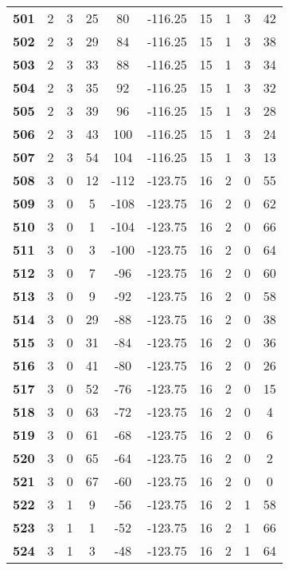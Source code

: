 \documentclass{article}%
\begin{document}
\begin{longtable}{cccccccccc}
        \textbf{501} & 2 & 3 & 25 & 80 & -116.25 & 15 & 1 & 3 & 42 \\ 
        \textbf{502} & 2 & 3 & 29 & 84 & -116.25 & 15 & 1 & 3 & 38 \\ 
        \textbf{503} & 2 & 3 & 33 & 88 & -116.25 & 15 & 1 & 3 & 34 \\ 
        \textbf{504} & 2 & 3 & 35 & 92 & -116.25 & 15 & 1 & 3 & 32 \\ 
        \textbf{505} & 2 & 3 & 39 & 96 & -116.25 & 15 & 1 & 3 & 28 \\ 
        \textbf{506} & 2 & 3 & 43 & 100 & -116.25 & 15 & 1 & 3 & 24 \\ 
        \textbf{507} & 2 & 3 & 54 & 104 & -116.25 & 15 & 1 & 3 & 13 \\ 
        \textbf{508} & 3 & 0 & 12 & -112 & -123.75 & 16 & 2 & 0 & 55 \\ 
        \textbf{509} & 3 & 0 & 5 & -108 & -123.75 & 16 & 2 & 0 & 62 \\ 
        \textbf{510} & 3 & 0 & 1 & -104 & -123.75 & 16 & 2 & 0 & 66 \\ 
        \textbf{511} & 3 & 0 & 3 & -100 & -123.75 & 16 & 2 & 0 & 64 \\ 
        \textbf{512} & 3 & 0 & 7 & -96 & -123.75 & 16 & 2 & 0 & 60 \\ 
        \textbf{513} & 3 & 0 & 9 & -92 & -123.75 & 16 & 2 & 0 & 58 \\ 
        \textbf{514} & 3 & 0 & 29 & -88 & -123.75 & 16 & 2 & 0 & 38 \\ 
        \textbf{515} & 3 & 0 & 31 & -84 & -123.75 & 16 & 2 & 0 & 36 \\ 
        \textbf{516} & 3 & 0 & 41 & -80 & -123.75 & 16 & 2 & 0 & 26 \\ 
        \textbf{517} & 3 & 0 & 52 & -76 & -123.75 & 16 & 2 & 0 & 15 \\ 
        \textbf{518} & 3 & 0 & 63 & -72 & -123.75 & 16 & 2 & 0 & 4 \\ 
        \textbf{519} & 3 & 0 & 61 & -68 & -123.75 & 16 & 2 & 0 & 6 \\ 
        \textbf{520} & 3 & 0 & 65 & -64 & -123.75 & 16 & 2 & 0 & 2 \\ 
        \textbf{521} & 3 & 0 & 67 & -60 & -123.75 & 16 & 2 & 0 & 0 \\ 
        \textbf{522} & 3 & 1 & 9 & -56 & -123.75 & 16 & 2 & 1 & 58 \\ 
        \textbf{523} & 3 & 1 & 1 & -52 & -123.75 & 16 & 2 & 1 & 66 \\ 
        \textbf{524} & 3 & 1 & 3 & -48 & -123.75 & 16 & 2 & 1 & 64 \\ 

\end{longtable}
\end{document}

